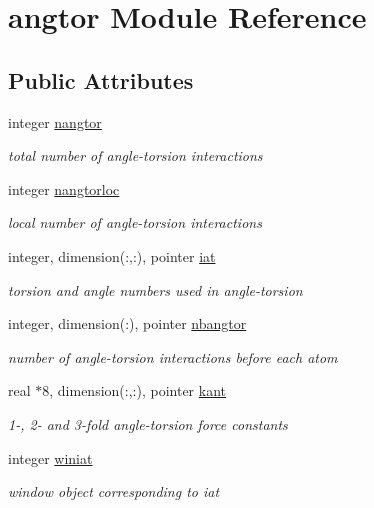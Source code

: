 \hypertarget{classangtor}{\section{angtor Module Reference}
\label{classangtor}
}
\subsection*{Public Attributes}
\begin{DoxyCompactItemize}
\item 
integer \hyperlink{classangtor_ab2d904f07d61c24e703df88e353cfb80}{nangtor}
\begin{DoxyCompactList}\small\item\em total number of angle-\/torsion interactions \end{DoxyCompactList}\item 
integer \hyperlink{classangtor_ab216731119c8bc414c28abe37fca62f3}{nangtorloc}
\begin{DoxyCompactList}\small\item\em local number of angle-\/torsion interactions \end{DoxyCompactList}\item 
integer, dimension(\-:,\-:), pointer \hyperlink{classangtor_ae80a65c59331cc568ca3967bd8c70d7c}{iat}
\begin{DoxyCompactList}\small\item\em torsion and angle numbers used in angle-\/torsion \end{DoxyCompactList}\item 
integer, dimension(\-:), pointer \hyperlink{classangtor_aa08cce1ef8c68fdd3aaeb4798cefc3ee}{nbangtor}
\begin{DoxyCompactList}\small\item\em number of angle-\/torsion interactions before each atom \end{DoxyCompactList}\item 
real $\ast$8, dimension(\-:,\-:), pointer \hyperlink{classangtor_ab85a39f9262c8621278d6999a6c1bcc6}{kant}
\begin{DoxyCompactList}\small\item\em 1-\/, 2-\/ and 3-\/fold angle-\/torsion force constants \end{DoxyCompactList}\item 
integer \hyperlink{classangtor_a0be3fa8ffc98e957dfb888166803bef9}{winiat}
\begin{DoxyCompactList}\small\item\em window object corresponding to iat \end{DoxyCompactList}\item 

\end{DoxyCompactItemize}
